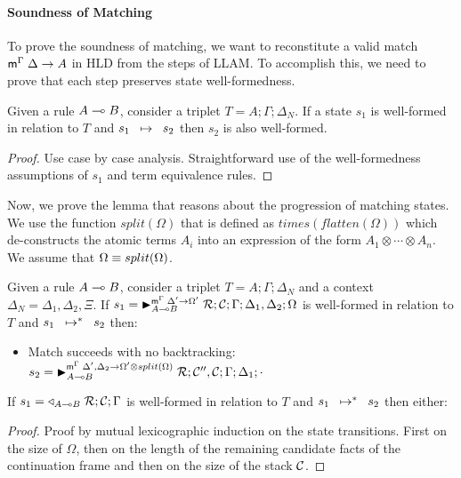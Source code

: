 \paragraph{Soundness of Matching} To prove the soundness of matching, we want to
reconstitute a valid match $\mz{\Gamma}{\Delta}{A}$ in HLD from the steps of
LLAM. To accomplish this, we need to prove that each step preserves 
state well-formedness.

\begin{theorem}
Given a rule $A \lolli B$, consider a triplet $T = A; \Gamma; \Delta_{N}$.
If a state $s_1$ is well-formed in relation to $T$ and $\trans{s_1}{s_2}$ then
$s_2$ is also well-formed.
\end{theorem}
\begin{proof}
Use case by case analysis. Straightforward use of the well-formedness
assumptions of $s_1$ and term equivalence rules.
\end{proof}

Now, we  prove the lemma that reasons about the progression of matching states.
We use the function $split(\Omega)$ that is defined as $times(flatten(\Omega))$
which de-constructs the atomic terms $A_i$ into an expression of the form $A_1
\otimes \cdots \otimes A_n$. We assume that $\feq{\Omega}{split(\Omega)}$.

\begin{lemma}\label{thm:body_match}
  Given a rule $A \lolli B$, consider a triplet $T = A; \Gamma; \Delta_{N}$ and
  a context $\Delta_{N} = \Delta_1, \Delta_2, \Xi$.  If $s_1 = \matstate{A
  \lolli B}{\rulestk}{\lstack{C}}{\Gamma}{\Delta_1, \Delta_2}{\Omega}{\Delta'
  \rightarrow \Omega'}$ is well-formed in relation to $T$ and
  $\transs{s_1}{s_2}$ then:

  \begin{itemize}
     \item Match succeeds with no backtracking: $s_2 = \matstate{A \lolli B}{\rulestk}{\lstack{C''},
           \lstack{C}}{\Gamma}{\Delta_1}{\cdot}{\Delta', \Delta_2 \rightarrow
              \Omega' \otimes split(\Omega)}$

     

  \end{itemize}

  If $s_1 = \contstate{A \lolli B}{\rulestk}{\lstack{C}}{\Gamma}$
  is well-formed in relation to $T$ and $\transs{s_1}{s_2}$ then either:

  \begin{itemize}
     
  \end{itemize}
\end{lemma}
\begin{proof}
   Proof by mutual lexicographic induction on the state transitions. First on the size
   of $\Omega$, then on the length of the remaining candidate facts of the
   continuation frame and then on the size of the stack $\lstack{C}$.
\end{proof}

